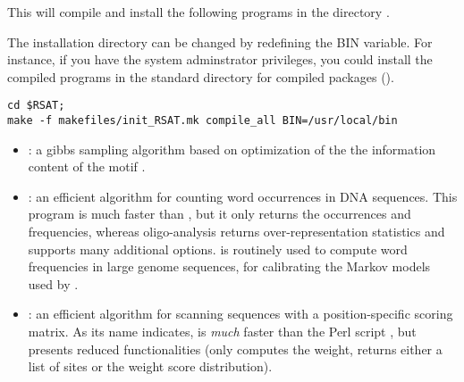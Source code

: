 \documentclass[12pt,a4paper, oneside]{scrreprt} %
\begin{document}
This will compile and install the following programs in the directory
. 

The installation directory can be changed by redefining the BIN
variable. For instance, if you have the system adminstrator
privileges, you could install the compiled programs in the standard
directory for compiled packages ().

\begin{lstlisting}
cd $RSAT;
make -f makefiles/init_RSAT.mk compile_all BIN=/usr/local/bin
\end{lstlisting}


\begin{itemize}
\item {}: a gibbs sampling algorithm based on
  optimization of the the information content of the motif
  \cite{Defrance:2009}.

\item {}: an efficient algorithm for counting word
  occurrences in DNA sequences. This program is much faster than
  , but it only returns the occurrences and
  frequencies, whereas oligo-analysis returns over-representation
  statistics and supports many additional
  options.  is routinely used to compute word
  frequencies in large genome sequences, for calibrating the Markov
  models used by .

\item {}: an efficient algorithm for scanning
  sequences with a position-specific scoring matrix. As its name
  indicates,  is \emph{much} faster than
  the Perl script , but presents reduced
  functionalities (only computes the weight, returns either a list of
  sites or the weight score distribution).
\end{itemize}












\end{document}
